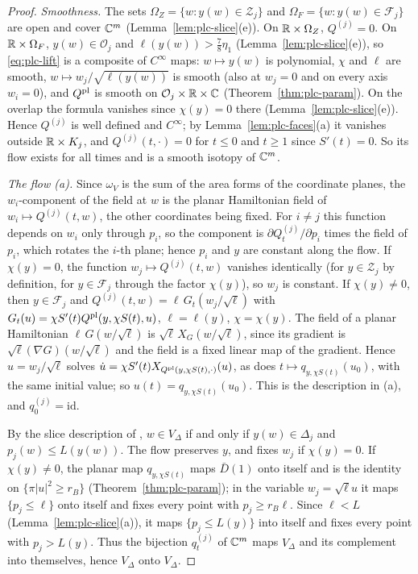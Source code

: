 \begin{proof}
\emph{Smoothness.} The sets $\Omega_Z=\{w:y(w)\in\mathcal Z_j\}$ and $\Omega_F=\{w:y(w)\in\mathcal F_j\}$ are open and cover
$\mathbb{C}^m$ (Lemma~\ref{lem:plc-slice}(e)). On $\mathbb{R}\times\Omega_Z$, $Q^{(j)}=0$. On $\mathbb{R}\times\Omega_F$, $y(w)\in\mathcal O_j$ and
$\ell(y(w))>\frac78\eta_1$ (Lemma~\ref{lem:plc-slice}(e)), so \eqref{eq:plc-lift} is a composite of $C^\infty$ maps: $w\mapsto y(w)$ is
polynomial, $\chi$ and $\ell$ are smooth, $w\mapsto w_j/\sqrt{\ell(y(w))}$ is smooth (also at $w_j=0$ and on every axis
$w_i=0$), and $Q^{\rm pl}$ is smooth on $\mathcal O_j\times\mathbb{R}\times\mathbb{C}$ (Theorem~\ref{thm:plc-param}). On the overlap the formula
vanishes since $\chi(y)=0$ there (Lemma~\ref{lem:plc-slice}(e)). Hence $Q^{(j)}$ is well defined and $C^\infty$; by
Lemma~\ref{lem:plc-faces}(a) it vanishes outside $\mathbb{R}\times K_j$, and $Q^{(j)}(t,\cdot)=0$ for $t\le0$ and $t\ge1$ since $S'(t)=0$.
So its flow exists for all times and is a smooth isotopy of $\mathbb{C}^m$.

\emph{The flow (a).} Since $\omega_V$ is the sum of the area forms of the coordinate planes, the $w_i$-component of the
field at $w$ is the planar Hamiltonian field of $w_i\mapsto Q^{(j)}(t,w)$, the other coordinates being fixed. For $i\ne j$ this
function depends on $w_i$ only through $p_i$, so the component is $\partial Q^{(j)}_t/\partial p_i$ times the field of $p_i$, which
rotates the $i$-th plane; hence $p_i$ and $y$ are constant along the flow. If $\chi(y)=0$, the function
$w_j\mapsto Q^{(j)}(t,w)$ vanishes identically (for $y\in\mathcal Z_j$ by definition, for $y\in\mathcal F_j$ through the factor
$\chi(y)$), so $w_j$ is constant. If $\chi(y)\ne0$, then $y\in\mathcal F_j$ and $Q^{(j)}(t,w)=\ell\,G_t(w_j/\sqrt\ell)$ with
$G_t(u)=\chi S'(t)Q^{\rm pl}(y,\chi S(t),u)$, $\ell=\ell(y)$, $\chi=\chi(y)$. The field of a planar Hamiltonian $\ell\,G(w/\sqrt\ell)$ is
$\sqrt\ell\,X_G(w/\sqrt\ell)$, since its gradient is $\sqrt\ell(\nabla G)(w/\sqrt\ell)$ and the field is a fixed linear map of the
gradient. Hence $u=w_j/\sqrt\ell$ solves $\dot u=\chi S'(t)X_{Q^{\rm pl}(y,\chi S(t),\cdot)}(u)$, as does
$t\mapsto q_{y,\chi S(t)}(u_0)$, with the same initial value; so $u(t)=q_{y,\chi S(t)}(u_0)$. This is the description in (a), and
$q^{(j)}_0=\mathrm{id}$.

By the slice description of , $w\in V_\Delta$ if and only if $y(w)\in\Delta_j$ and $p_j(w)\le L(y(w))$. The flow preserves $y$, and
fixes $w_j$ if $\chi(y)=0$. If $\chi(y)\ne0$, the planar map $q_{y,\chi S(t)}$ maps $\bar D(1)$ onto itself and is the identity on $\{\pi|u|^2\ge r_B\}$
(Theorem~\ref{thm:plc-param}); in the variable $w_j=\sqrt\ell u$ it maps $\{p_j\le\ell\}$ onto itself and fixes every point with
$p_j\ge r_B\ell$. Since $\ell<L$ (Lemma~\ref{lem:plc-slice}(a)), it maps $\{p_j\le L(y)\}$ into itself and fixes every point with
$p_j>L(y)$. Thus the bijection $q^{(j)}_t$ of $\mathbb{C}^m$ maps $V_\Delta$ and its complement into themselves, hence $V_\Delta$ onto $V_\Delta$.


\end{proof}
